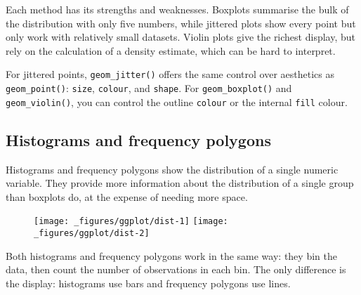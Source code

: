 Each method has its strengths and weaknesses. Boxplots summarise the
bulk of the distribution with only five numbers, while jittered plots
show every point but only work with relatively small datasets. Violin
plots give the richest display, but rely on the calculation of a density
estimate, which can be hard to interpret.

For jittered points, \texttt{geom\_jitter()} offers the same control
over aesthetics as \texttt{geom\_point()}: \texttt{size},
\texttt{colour}, and \texttt{shape}. For \texttt{geom\_boxplot()} and
\texttt{geom\_violin()}, you can control the outline \texttt{colour} or
the internal \texttt{fill} colour.

\hypertarget{sub:distribution}{%
\subsection{Histograms and frequency polygons}\label{sub:distribution}}

Histograms and frequency polygons show the distribution of a single
numeric variable. They provide more information about the distribution
of a single group than boxplots do, at the expense of needing more
space.  

\begin{Shaded}
\begin{Highlighting}[]
\OperatorTok{+}\StringTok{ }\NormalTok{()}
\OperatorTok{+}\StringTok{ }\NormalTok{()}
\end{Highlighting}
\end{Shaded}

\begin{figure}[H]
  \texttt{[image: \_figures/ggplot/dist-1]}%
  \texttt{[image: \_figures/ggplot/dist-2]}
\end{figure}

Both histograms and frequency polygons work in the same way: they bin
the data, then count the number of observations in each bin. The only
difference is the display: histograms use bars and frequency polygons
use lines.

